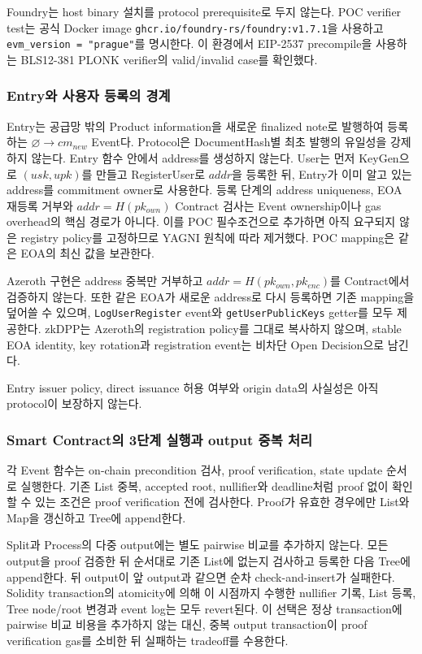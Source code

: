 \documentclass[11pt]{extarticle}
\begin{document}
Foundry는 host binary 설치를 protocol prerequisite로 두지 않는다. POC verifier test는
공식 Docker image \texttt{ghcr.io/foundry-rs/foundry:v1.7.1}을 사용하고
\texttt{evm\_version = "prague"}를 명시한다. 이 환경에서 EIP-2537 precompile을
사용하는 BLS12-381 PLONK verifier의 valid/invalid case를 확인했다.

\subsubsection{Entry와 사용자 등록의 경계}

Entry는 공급망 밖의 Product information을 새로운 finalized note로 발행하여 등록하는
$\varnothing\rightarrow cm_{new}$ Event다. Protocol은 DocumentHash별 최초 발행의
유일성을 강제하지 않는다. Entry 함수 안에서 address를 생성하지 않는다.
User는 먼저 KeyGen으로 $(usk,upk)$를 만들고 RegisterUser로 $addr$을 등록한 뒤, Entry가
이미 알고 있는 address를 commitment owner로 사용한다. 등록 단계의 address uniqueness,
EOA 재등록 거부와 $addr=H(pk_{own})$ Contract 검사는 Event ownership이나 gas overhead의
핵심 경로가 아니다. 이를 POC 필수조건으로 추가하면 아직 요구되지 않은 registry policy를
고정하므로 YAGNI 원칙에 따라 제거했다. POC mapping은 같은 EOA의 최신 값을 보관한다.

Azeroth 구현은 address 중복만 거부하고 $addr=H(pk_{own},pk_{enc})$를 Contract에서
검증하지 않는다. 또한 같은 EOA가 새로운 address로 다시 등록하면 기존 mapping을
덮어쓸 수 있으며, \texttt{LogUserRegister} event와 \texttt{getUserPublicKeys} getter를
모두 제공한다. zkDPP는 Azeroth의 registration policy를 그대로 복사하지 않으며,
stable EOA identity, key rotation과 registration event는 비차단 Open Decision으로 남긴다.

Entry issuer policy, direct
issuance 허용 여부와 origin data의 사실성은 아직 protocol이 보장하지 않는다.

\subsubsection{Smart Contract의 3단계 실행과 output 중복 처리}

각 Event 함수는 on-chain precondition 검사, proof verification, state update 순서로
실행한다. 기존 List 중복, accepted root, nullifier와 deadline처럼 proof 없이 확인할 수
있는 조건은 proof verification 전에 검사한다. Proof가 유효한 경우에만 List와 Map을
갱신하고 Tree에 append한다.

Split과 Process의 다중 output에는 별도 pairwise 비교를 추가하지 않는다. 모든 output을
proof 검증한 뒤 순서대로 기존 List에 없는지 검사하고 등록한 다음 Tree에 append한다.
뒤 output이 앞 output과 같으면 순차 check-and-insert가 실패한다. Solidity transaction의
atomicity에 의해 이 시점까지 수행한 nullifier 기록, List 등록, Tree node/root 변경과
event log는 모두 revert된다. 이 선택은 정상 transaction에 pairwise 비교 비용을 추가하지
않는 대신, 중복 output transaction이 proof verification gas를 소비한 뒤 실패하는
tradeoff를 수용한다.
\end{document}

